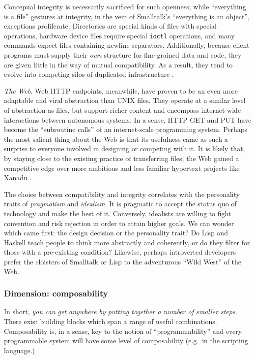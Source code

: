 \documentclass[english,submission]{programming}
\begin{document}
Concepual integrity is necessarily sacrificed for such openness; while
``everything is a file'' gestures at integrity, in the vein of
Smalltalk's ``everything is an object'', exceptions proliferate.
Directories are special kinds of files with special operations, hardware
device files require special \texttt{ioctl} operations, and many
commands expect files containing newline separators. Additionally,
because client programs must supply their \emph{own} structure for
fine-grained data and code, they are given little in the way of mutual
compatibility. As a result, they tend to evolve into competing silos of
duplicated infrastructure \cite{KellOS,Mythical}.

\emph{The Web}. Web HTTP endpoints, meanwhile, have proven to be an even
more adaptable and viral abstraction than UNIX files. They operate at a
similar level of abstraction as files, but support richer content and
encompass internet-wide interactions between autonomous systems. In a
sense, HTTP GET and PUT have become the ``subroutine calls'' of an
internet-scale programming system. Perhaps the most salient thing about
the Web is that its usefulness came as such a surprise to everyone
involved in designing or competing with it. It is likely that, by
staying close to the existing practice of transferring files, the Web
gained a competitive edge over more ambitious and less familiar
hypertext projects like Xanadu \cite{TedNelson}.

The choice between compatibility and integrity correlates with the
personality traits of \emph{pragmatism} and \emph{idealism}. It is
pragmatic to accept the status quo of technology and make the best of
it. Conversely, idealists are willing to fight convention and risk
rejection in order to attain higher goals. We can wonder which came
first: the design decision or the personality trait? Do Lisp and Haskell
teach people to think more abstractly and coherently, or do they filter
for those with a pre-existing condition? Likewise, perhaps introverted
developers prefer the cloisters of Smalltalk or Lisp to the adventurous
``Wild West'' of the Web.

\hypertarget{dimension-composability}{%
\subsubsection{Dimension: composability}\label{dimension-composability}}

In short, \emph{you can get anywhere by putting together a number of
smaller steps.} There exist building blocks which span a range of useful
combinations.
Composability is, in a sense, key to the notion of ``programmability''
and every programmable system will have some level of composability
(e.g.~in the scripting language.)
\end{document}
